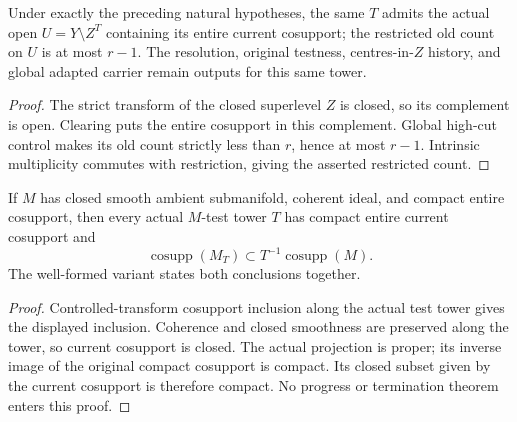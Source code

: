 \begin{lemma}
\label{hir:original-old-branch-lowdep-count-drop}
\leanok
Under exactly the preceding natural hypotheses, the same $T$ admits
the actual open $U=Y\setminus Z^T$ containing its entire current
cosupport; the restricted old count on $U$ is at most $r-1$.
The resolution, original testness, centres-in-$Z$ history, and global
adapted carrier remain outputs for this same tower.
\end{lemma}
\begin{proof}
The strict transform of the closed superlevel $Z$ is closed, so its
complement is open. Clearing puts the entire cosupport in this
complement. Global high-cut control makes its old count strictly less
than $r$, hence at most $r-1$. Intrinsic multiplicity commutes with
restriction, giving the asserted restricted count.
\end{proof}

\begin{lemma}
\label{hir:original-old-branch-lowdep-current-compact}
\leanok
If $M$ has closed smooth ambient submanifold, coherent ideal, and
compact entire cosupport, then every actual $M$-test tower $T$ has
compact entire current cosupport and
\[
 \operatorname{cosupp}(M_T)\subset T^{-1}\operatorname{cosupp}(M).
\]
The well-formed variant states both conclusions together.
\end{lemma}
\begin{proof}
Controlled-transform cosupport inclusion along the actual test tower
gives the displayed inclusion. Coherence and closed smoothness are
preserved along the tower, so current cosupport is closed.
The actual projection is proper; its inverse image of the original
compact cosupport is compact. Its closed subset given by the current
cosupport is therefore compact. No progress or termination theorem
enters this proof.
\end{proof}

